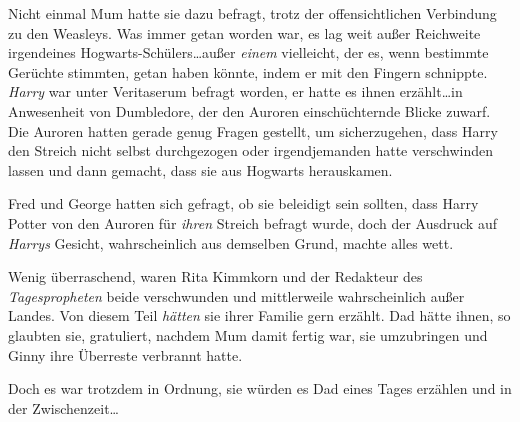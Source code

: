 Nicht einmal Mum hatte sie dazu befragt, trotz der offensichtlichen Verbindung zu den Weasleys. Was immer getan worden war, es lag weit außer Reichweite irgendeines Hogwarts-Schülers…außer \emph{einem} vielleicht, der es, wenn bestimmte Gerüchte stimmten, getan haben könnte, indem er mit den Fingern schnippte. \emph{Harry} war unter Veritaserum befragt worden, er hatte es ihnen erzählt…in Anwesenheit von Dumbledore, der den Auroren einschüchternde Blicke zuwarf. Die Auroren hatten gerade genug Fragen gestellt, um sicherzugehen, dass Harry den Streich nicht selbst durchgezogen oder irgendjemanden hatte verschwinden lassen und dann gemacht, dass sie aus Hogwarts herauskamen.

Fred und George hatten sich gefragt, ob sie beleidigt sein sollten, dass Harry Potter von den Auroren für \emph{ihren} Streich befragt wurde, doch der Ausdruck auf \emph{Harrys} Gesicht, wahrscheinlich aus demselben Grund, machte alles wett.

Wenig überraschend, waren Rita Kimmkorn und der Redakteur des \emph{Tagespropheten} beide verschwunden und mittlerweile wahrscheinlich außer Landes. Von diesem Teil \emph{hätten} sie ihrer Familie gern erzählt. Dad hätte ihnen, so glaubten sie, gratuliert, nachdem Mum damit fertig war, sie umzubringen und Ginny ihre Überreste verbrannt hatte.

Doch es war trotzdem in Ordnung, sie würden es Dad eines Tages erzählen und in der Zwischenzeit…


